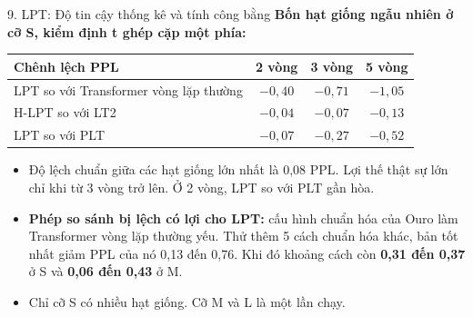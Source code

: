 \begin{frame}{9. LPT: Độ tin cậy thống kê và tính công bằng}
    \textbf{Bốn hạt giống ngẫu nhiên ở cỡ S, kiểm định t ghép cặp một phía:}
    \begin{table}[h]
        \centering
        \small
        \begin{tabular}{lccc}
            \toprule
            \textbf{Chênh lệch PPL} & \textbf{2 vòng} & \textbf{3 vòng} & \textbf{5 vòng} \\
            \midrule
            LPT so với Transformer vòng lặp thường & $-0{,}40$ & $-0{,}71$ & $-1{,}05$ \\
            H-LPT so với LT2 & $-0{,}04$ & $-0{,}07$ & $-0{,}13$ \\
            LPT so với PLT & $-0{,}07$ & $-0{,}27$ & $-0{,}52$ \\
            \bottomrule
        \end{tabular}
    \end{table}
    \vspace{-0.2cm}
    \begin{small}
    \begin{itemize}
        \item Độ lệch chuẩn giữa các hạt giống lớn nhất là 0,08 PPL. Lợi thế thật sự lớn chỉ khi từ 3 vòng trở lên. Ở 2 vòng, LPT so với PLT gần hòa.
        \item \textbf{Phép so sánh bị lệch có lợi cho LPT:} cấu hình chuẩn hóa của Ouro làm Transformer vòng lặp thường yếu. Thử thêm 5 cách chuẩn hóa khác, bản tốt nhất giảm PPL của nó 0,13 đến 0,76. Khi đó khoảng cách còn \textbf{0,31 đến 0,37} ở S và \textbf{0,06 đến 0,43} ở M.
        \item Chỉ cỡ S có nhiều hạt giống. Cỡ M và L là một lần chạy.
    \end{itemize}
    \end{small}
\end{frame}


